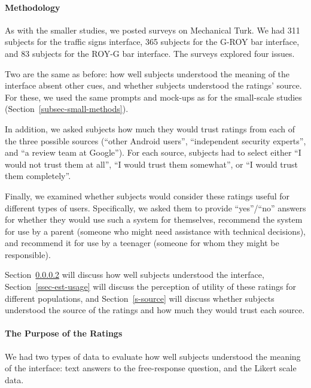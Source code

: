 \documentclass[11pt]{article}
\newcommand{\refsec}[1]{Section~\ref{#1}}
\begin{document}
\paragraph{Methodology}
\label{subsec-large-methods}

As with the smaller studies, we posted surveys on Mechanical
Turk. We had 311 subjects for the traffic signs interface, 365
subjects for the G-ROY bar interface, and 83 subjects for the ROY-G bar
interface. The surveys explored four issues. 

Two are the same
as before: how well subjects understood the meaning of the interface
absent other cues, and whether subjects understood the ratings' source.
For these, we used the same prompts and mock-ups as for the
small-scale studies (\refsec{subsec-small-methods}).

In addition, we asked 
subjects how much they would trust ratings from each
of the three possible sources (``other Android users'', 
``independent security experts'', and ``a review team at Google''). 
For each source, subjects
had to select either ``I would not trust them at all'',
``I would trust them somewhat'', or ``I would trust 
them completely''.

Finally, we examined whether subjects would consider
these ratings useful for different types of users.
Specifically, we asked them to
provide ``yes''/``no'' answers for whether they would 
use such a system for themselves, recommend the system for use by a
parent (someone who might need assistance with technical decisions), and 
recommend it for use
by a teenager (someone for whom they might be
responsible).

\refsec{subsec-subject-understanding} will discuss how well
subjects understood the interface, \refsec{ssec-est-usage} will 
discuss the perception of utility of these ratings for different
populations, and \refsec{s-source} will discuss whether subjects 
understood the source of the ratings and how much they would trust each source.

\paragraph{The Purpose of the Ratings}
\label{subsec-subject-understanding}

We had two types of data to evaluate how well subjects understood
the meaning of the interface: text answers to the free-response 
question, and the Likert scale data.
\end{document}
